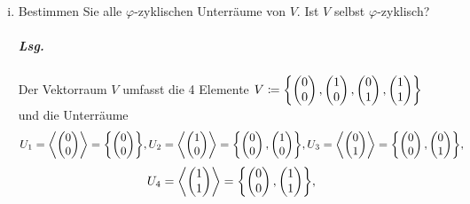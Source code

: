 \documentclass{scrreprt}
\begin{document}
\begin{enumerate}[(i)]
\item Bestimmen Sie alle $\varphi$-zyklischen Unterräume von $V$.
  Ist $V$ selbst $\varphi$-zyklisch?

  \subparagraph{Lsg.} Der Vektorraum $V$ umfasst die 4 Elemente
  $
    V \coloneqq \qty{
      \begin{pmatrix}0\\0\end{pmatrix},
      \begin{pmatrix}1\\0\end{pmatrix},
      \begin{pmatrix}0\\1\end{pmatrix},
      \begin{pmatrix}1\\1\end{pmatrix}
    }
  $
  und die Unterräume
  \[
    U_1 = \left\langle \begin{pmatrix}0\\0\end{pmatrix} \right\rangle =
    \qty{\begin{pmatrix}0\\0\end{pmatrix}},
    U_2 = \left\langle \begin{pmatrix}1\\0\end{pmatrix} \right\rangle =
    \qty{\begin{pmatrix}0\\0\end{pmatrix}, \begin{pmatrix}1\\0\end{pmatrix}},
    U_3 = \left\langle \begin{pmatrix}0\\1\end{pmatrix} \right\rangle =
    \qty{\begin{pmatrix}0\\0\end{pmatrix}, \begin{pmatrix}0\\1\end{pmatrix}},
  \]
  \[
    U_4 = \left\langle \begin{pmatrix}1\\1\end{pmatrix} \right\rangle =
    \qty{\begin{pmatrix}0\\0\end{pmatrix}, \begin{pmatrix}1\\1\end{pmatrix}},
\]
\end{enumerate}
\end{document}
